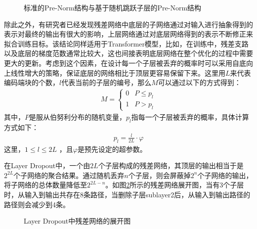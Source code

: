 \begin{figure}[htp]
\centering

\caption{标准的Pre-Norm结构与基于随机跳跃子层的Pre-Norm结构}
\label{fig:7-34}
\end{figure}

\parinterval 除此之外，有研究者已经发现残差网络中底层的子网络通过对输入进行抽象得到的表示对最终的输出有很大的影响，上层网络通过对底层网络得到的表示不断修正来拟合训练目标\cite{DBLP:journals/corr/GreffSS16}。该结论同样适用于Transformer模型，比如，在训练中，残差支路以及底层的梯度范数通常比较大，这也间接表明底层网络在整个优化的过程中需要更大的更新。考虑到这个因素，在设计每一个子层被丢弃的概率时可以采用自底向上线性增大的策略，保证底层的网络相比于顶层更容易保留下来。这里用$L$来代表编码端块的个数，$l$代表当前的子层的编号，那么$M$可以通过以下的方式得到：
\begin{eqnarray}
M = \left\{\begin{array}{ll}
0&P \leqslant p_l\\
1&P > p_l
\end{array}\right.
\label{eq:7-26}
\end{eqnarray}
其中，$P$是服从伯努利分布的随机变量，$p_l$指每一个子层被丢弃的概率，具体计算方式如下：
\begin{eqnarray}
p_l=\frac{l}{2L}\cdot \varphi
\label{eq:7-27}
\end{eqnarray}
这里，$1 \leqslant l \leqslant 2L$ ，且$\varphi$是预先设定的超参数。

\parinterval 在Layer Dropout中，一个由$2L$个子层构成的残差网络，其顶层的输出相当于是$2^{2L}$个子网络的聚合结果。通过随机丢弃$n$个子层，则会屏蔽掉$2^n$个子网络的输出，将子网络的总体数量降低至$2^{2L-n}$。如图\ref{fig:7-35}所示的残差网络展开图，当有3个子层时，从输入到输出共存在8条路径，当删除子层sublayer2后，从输入到输出路径的路径则会减少到4条。

\begin{figure}[htp]
\centering

\caption{Layer Dropout中残差网络的展开图}
\label{fig:7-35}
\end{figure}



